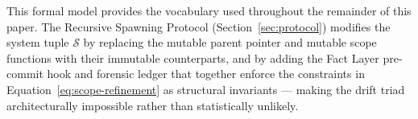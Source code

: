 This formal model provides the vocabulary used throughout the remainder of this paper. The Recursive Spawning Protocol (Section~\ref{sec:protocol}) modifies the system tuple $\mathcal{S}$ by replacing the mutable parent pointer and mutable scope functions with their immutable counterparts, and by adding the Fact Layer pre-commit hook and forensic ledger that together enforce the constraints in Equation~\ref{eq:scope-refinement} as structural invariants — making the drift triad architecturally impossible rather than statistically unlikely.
